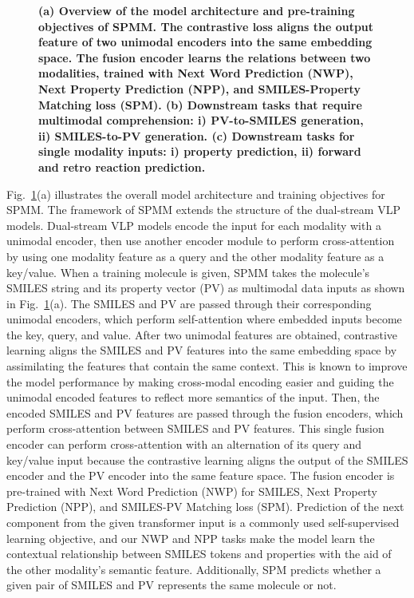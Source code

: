 \documentclass{nature_meth}
\newcommand{\1}{\blmath{1}}
\newcommand{\0}{\blmath{0}}
\begin{document}
\begin{figure}[!t]
	\centering
 \centerline{}
	\caption{\bf\footnotesize 
(a) Overview of the model architecture and pre-training objectives of SPMM. {The contrastive loss aligns the output feature of two unimodal encoders into the same embedding space. The fusion encoder learns the relations between two modalities, trained with Next Word Prediction (NWP), Next Property Prediction (NPP), and SMILES-Property Matching loss (SPM). (b) Downstream tasks that require multimodal comprehension: i) PV-to-SMILES generation, ii) SMILES-to-PV generation. (c) Downstream tasks for single modality inputs: i) property prediction, ii) forward and retro reaction prediction.}}
	\label{fig1}
\end{figure}


Fig.~\ref{fig1}(a) illustrates the overall model architecture and training objectives for SPMM. The framework of SPMM extends the structure of the dual-stream VLP models\cite{coca,albef,xvl}. Dual-stream VLP models encode the input for each modality with a unimodal encoder, then use another encoder module to perform cross-attention by using one modality feature as a query and the other modality feature as a key/value. 
When a training molecule is given, SPMM takes the molecule's SMILES string and its property vector (PV) as multimodal data inputs as shown in Fig.~\ref{fig1}(a). The SMILES and PV are passed through their corresponding unimodal encoders, which perform self-attention where embedded inputs become the key, query, and value. 
After two unimodal features are obtained, contrastive learning aligns the SMILES and PV features into the same embedding space by assimilating the features that contain the same context. This is known to improve the model performance by making cross-modal encoding easier and guiding the unimodal encoded features to reflect more semantics of the input\cite{albef}. 
Then, the encoded SMILES and PV features are passed through the fusion encoders, which perform cross-attention between SMILES and PV features. This single fusion encoder can perform cross-attention with an alternation of its query and key/value input because the contrastive learning aligns the output of the SMILES encoder and the PV encoder into the same feature space.\cite{xvl} 
The fusion encoder is pre-trained with Next Word Prediction (NWP) for SMILES, Next Property Prediction (NPP), and SMILES-PV Matching loss (SPM). Prediction of the next component from the given transformer input is a commonly used self-supervised learning objective, and our NWP and NPP tasks make the model learn the contextual relationship between SMILES tokens and properties with the aid of the other modality’s semantic feature. Additionally, SPM predicts whether a given pair of SMILES and PV represents the same molecule or not.
\end{document}
